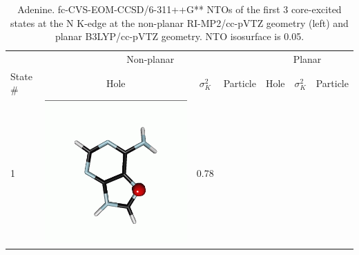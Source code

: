 \documentclass[journal=jctcce,manuscript=article]{achemso}
\begin{document}
\begin{table}[H]
\centering
\caption{Adenine. fc-CVS-EOM-CCSD/6-311++G** NTOs of the first 3 core-excited states at the N K-edge at the non-planar RI-MP2/cc-pVTZ geometry (left) and planar B3LYP/cc-pVTZ geometry. NTO isosurface is 0.05.\label{adenine-ntos-Nedge}}
\vspace{3em}
\small
\begin{tabular}{ l | c c c | c c c }
    \hline
            & \multicolumn{3}{c}{Non-planar} & \multicolumn{3}{|c}{Planar} \\
    State \# &  Hole &$\sigma_K^2$& Particle & Hole &$\sigma_K^2$& Particle \\
    \hline
    1 &  
    \begin{minipage}{0.2\textwidth}
        \centering
        \includegraphics[scale=0.10]{NTO/Adenine_N/1h_C1.png}
    \end{minipage}
    & 0.78
    &  \begin{minipage}{0.2\textwidth}
        \centering

\end{minipage}
\end{tabular}
\end{table}
\end{document}
